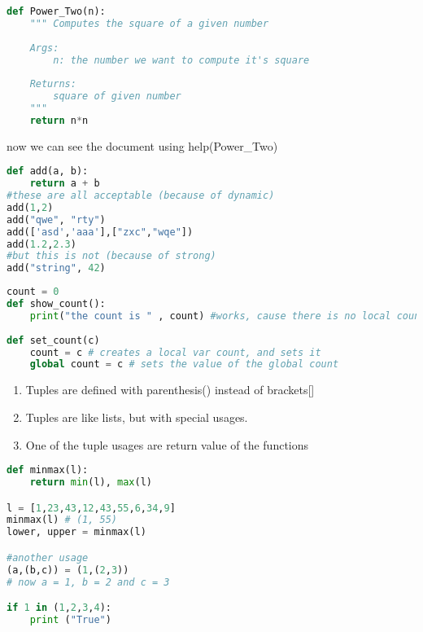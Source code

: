\begin{note}[Docstrings]
\begin{lstlisting}[language = {python}]
def Power_Two(n):
    """ Computes the square of a given number
    
    Args:
        n: the number we want to compute it's square
        
    Returns:
        square of given number
    """
    return n*n
\end{lstlisting}
now we can see the document using help(Power\_Two)
\end{note}
\begin{note}
\begin{lstlisting}[language = {python}]
def add(a, b):
    return a + b
#these are all acceptable (because of dynamic)
add(1,2)
add("qwe", "rty")
add(['asd','aaa'],["zxc","wqe"])
add(1.2,2.3)
#but this is not (because of strong)
add("string", 42)
\end{lstlisting}
\end{note}
\begin{note}[Scope]
\begin{lstlisting}[language = {python}]
count = 0
def show_count():
    print("the count is " , count) #works, cause there is no local count
    
def set_count(c)
    count = c # creates a local var count, and sets it
    global count = c # sets the value of the global count
\end{lstlisting}
\end{note}
\begin{note}[Tuples]
\begin{enumerate}
	\item Tuples are defined with parenthesis() instead of brackets[]
	\item Tuples are like lists, but with special usages.
	\item One of the tuple usages are return value of the functions
\end{enumerate}
\begin{lstlisting}[language = {python}]
def minmax(l):
    return min(l), max(l)

l = [1,23,43,12,43,55,6,34,9]
minmax(l) # (1, 55)
lower, upper = minmax(l)

#another usage
(a,(b,c)) = (1,(2,3))
# now a = 1, b = 2 and c = 3

if 1 in (1,2,3,4):
    print ("True")
\end{lstlisting}
\end{note}
